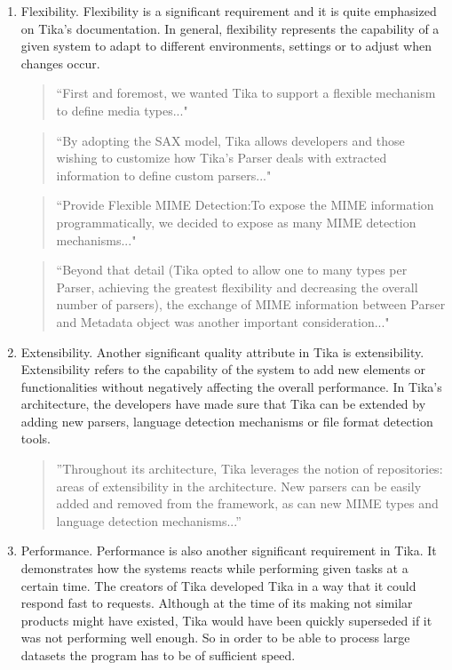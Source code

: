 \documentclass{article}
\begin{document}
\begin{enumerate}
    
    \item Flexibility. Flexibility is a significant requirement and it is quite emphasized on Tika's documentation. In general, flexibility represents the capability of a given system to adapt to different environments, settings or to adjust when changes occur. 
    
    \begin{quote}
        ``First and foremost, we wanted Tika to support a flexible mechanism to define media types..."
    \end{quote}
    
    \begin{quote}
        ``By adopting the SAX model, Tika allows developers and those wishing to customize how Tika’s Parser deals with extracted information to define custom parsers..."
    \end{quote}
    
    \begin{quote}
        ``Provide Flexible MIME Detection:To expose the MIME information programmatically, we decided to expose as many MIME detection mechanisms..."
    \end{quote}
    
    \begin{quote}
        ``Beyond that detail (Tika opted to allow one to many types per Parser, achieving the greatest flexibility and decreasing the overall number of parsers), the exchange of MIME information between Parser and Metadata object was another important consideration..."
    \end{quote}
    \item Extensibility. Another significant quality attribute in Tika is extensibility. Extensibility refers to the capability of the system to add new elements or functionalities without negatively affecting the overall performance. In Tika's architecture, the developers have made sure that Tika can be extended by adding new parsers, language detection mechanisms or file format detection tools.
    \begin{quote}
        ''Throughout its architecture, Tika leverages the notion of repositories: areas of extensibility in the architecture. New parsers can be easily added and removed from the framework, as can new MIME types and language detection mechanisms...''
    \end{quote}
    \item Performance. Performance is also another significant requirement in Tika. It demonstrates how the systems reacts while performing given tasks at a certain time. The creators of Tika developed Tika in a way that it could respond fast to requests. Although at the time of its making not similar products might have existed, Tika would have been quickly superseded if it was not performing well enough. So in order to be able to process large datasets the program has to be of sufficient speed.
    

\end{enumerate}
\end{document}
